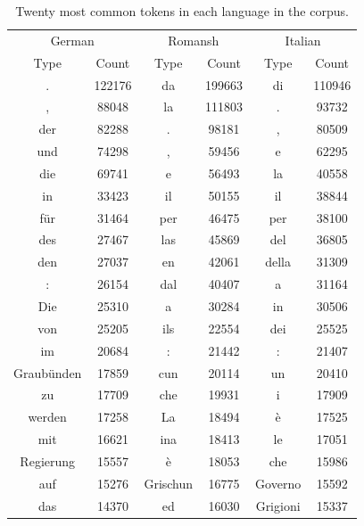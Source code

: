 \begin{table}
\centering
\begin{tabular}{cc|cc|cc}
\toprule
\multicolumn{2}{c|}{German} &  \multicolumn{2}{c|}{Romansh} & \multicolumn{2}{c}{Italian} \\
Type & Count & Type & Count & Type & Count\\
\midrule
.	&	122176	&	da	&	199663	&	di	&	110946 \\ 
,	&	88048	&	la	&	111803	&	.	&	93732 \\ 
der	&	82288	&	.	&	98181	&	,	&	80509 \\ 
und	&	74298	&	,	&	59456	&	e	&	62295 \\ 
die	&	69741	&	e	&	56493	&	la	&	40558 \\ 
in	&	33423	&	il	&	50155	&	il	&	38844 \\ 
für	&	31464	&	per	&	46475	&	per	&	38100 \\ 
des	&	27467	&	las	&	45869	&	del	&	36805 \\ 
den	&	27037	&	en	&	42061	&	della	&	31309 \\ 
:	&	26154	&	dal	&	40407	&	a	&	31164 \\ 
Die	&	25310	&	a	&	30284	&	in	&	30506 \\ 
von	&	25205	&	ils	&	22554	&	dei	&	25525 \\ 
im	&	20684	&	:	&	21442	&	:	&	21407 \\ 
Graubünden	&	17859	&	cun	&	20114	&	un	&	20410 \\ 
zu	&	17709	&	che	&	19931	&	i	&	17909 \\ 
werden	&	17258	&	La	&	18494	&	è	&	17525 \\ 
mit	&	16621	&	ina	&	18413	&	le	&	17051 \\ 
Regierung	&	15557	&	è	&	18053	&	che	&	15986 \\ 
auf	&	15276	&	Grischun	&	16775	&	Governo	&	15592 \\ 
das	&	14370	&	ed	&	16030	&	Grigioni	&	15337 \\ 
\bottomrule 
\end{tabular}
\caption{Twenty most common tokens in each language in the corpus.}
\label{tab:top-20}
\end{table}

